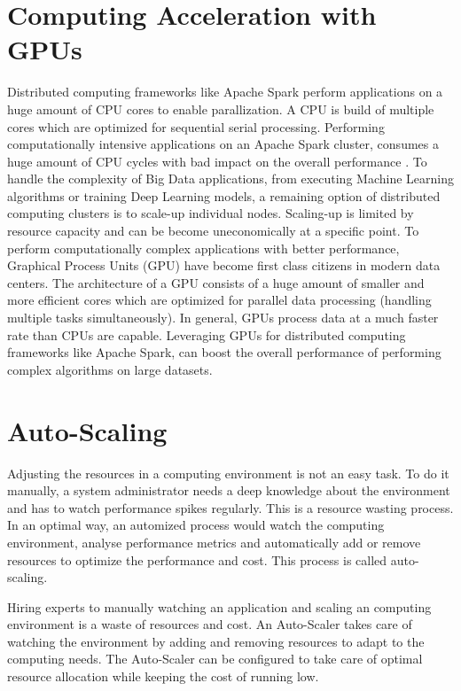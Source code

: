 \section{Computing Acceleration with GPUs}
Distributed computing frameworks like Apache Spark perform applications on a huge amount of CPU cores to enable parallization. A CPU is build of multiple cores which are optimized for sequential serial processing. Performing computationally intensive applications on an Apache Spark cluster, consumes a huge amount of CPU cycles with bad impact on the overall performance \cite{Li2015HeteroSpark}.
To handle the complexity of Big Data applications, from executing Machine Learning algorithms or training Deep Learning models, a remaining option of distributed computing clusters is to scale-up individual nodes. Scaling-up is limited by resource capacity and can be become uneconomically at a specific point.
To perform computationally complex applications with better performance, Graphical Process Units (GPU) have become first class citizens in modern data centers. The architecture of a GPU consists of a huge amount of smaller and more efficient cores which are optimized for parallel data processing (handling multiple tasks simultaneously). In general, GPUs process data at a much faster rate than CPUs are capable.
Leveraging GPUs for distributed computing frameworks like Apache Spark, can boost the overall performance of performing complex algorithms on large datasets.


\section{Auto-Scaling}
Adjusting the resources in a computing environment is not an easy task. To do it manually, a system administrator needs a deep knowledge about the environment and has to watch performance spikes regularly. This is a resource wasting process. In an optimal way, an automized process would watch the computing environment, analyse performance metrics and automatically add or remove resources to optimize the performance and cost. This process is called auto-scaling.


Hiring experts to manually watching an application and scaling an computing environment is a waste of resources and cost.
An Auto-Scaler takes care of watching the environment by adding and removing resources to adapt to the computing needs. The Auto-Scaler can be configured to take care of optimal resource allocation while keeping the cost of running low.


